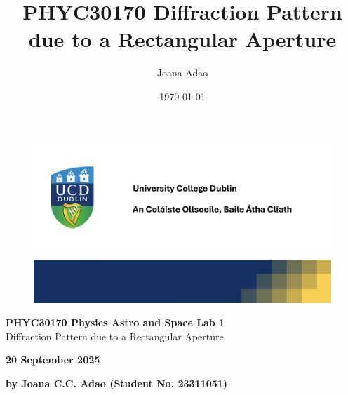 \documentclass[12pt]{article}
\title{PHYC30170 Diffraction Pattern due to a Rectangular Aperture}
\author{Joana Adao}
\date{\today}
\begin{document}
\begin{titlepage}
    \begin{center}

        \begin{figure}[ht]
            \includegraphics[width=\textwidth]{UCDLogo.png}
        \end{figure}
        
        \begin{figure}
            \centerline{\includegraphics[width=\paperwidth]{UCDBanner.png}}
        \end{figure}

        \vspace{4cm}

        {\LARGE \bfseries PHYC30170 Physics Astro and Space Lab 1}\\
        \vspace{0.75cm}
        {\Large Diffraction Pattern due to a Rectangular Aperture}\\
        
        \vspace{1cm}
    
    {\Large \textbf{20 September 2025}}

    \vspace{2cm}
    
    {\large \textbf{by Joana C.C. Adao (Student No. 23311051)}}\\

    \end{center}
    
   \clearpage

\end{titlepage}


\tableofcontents
\thispagestyle{empty}

\newpage
\end{document}

